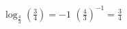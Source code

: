 {$\log_{\frac{4}{3}} \left(\frac{3}{4} \right) = -1$  }
{$\left(\frac{4}{3} \right)^{-1} = \frac{3}{4}$}